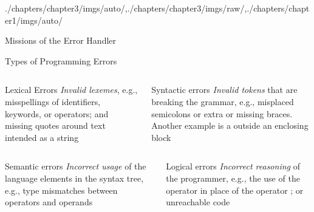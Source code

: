 \begin{graphicspathcontext}{{./chapters/chapter3/imgs/auto/},{./chapters/chapter3/imgs/raw/},{./chapters/chapter1/imgs/auto/}}
\begin{bibunit}[apalike]
\begin{frame}{{Missions} of the Error Handler}
	\hfill
	\hfill
\end{frame}

\begin{frame}{Types of Programming Errors}
	\begin{columns}
		\begin{column}[t]{.5\linewidth}
			\begin{block}{Lexical Errors}
				\emph{Invalid lexemes}, e.g., misspellings of identifiers, keywords, or operators; and missing quotes around text intended as a string
			\end{block}
		\end{column}
		\begin{column}[t]{.5\linewidth}
			\begin{block}{Syntactic errors}
				\emph{Invalid tokens} that are breaking the grammar, e.g., misplaced semicolons or extra or missing braces. Another example is a  outside an enclosing  block
			\end{block}
		\end{column}
	\end{columns}
	\vspace{.25cm}
	\begin{columns}
		\begin{column}[t]{.5\linewidth}
			\begin{block}{Semantic errors}
				\emph{Incorrect usage} of the language elements in the syntax tree, e.g., type mismatches between operators and operands
			\end{block}
		\end{column}
		\begin{column}[t]{.5\linewidth}
			\begin{block}{Logical errors}
				\emph{Incorrect reasoning} of the programmer, e.g., the use of the operator  in place of the operator ; or unreachable code
			\end{block}
		\end{column}
	\end{columns}
\end{frame}


\end{bibunit}
\end{graphicspathcontext}
